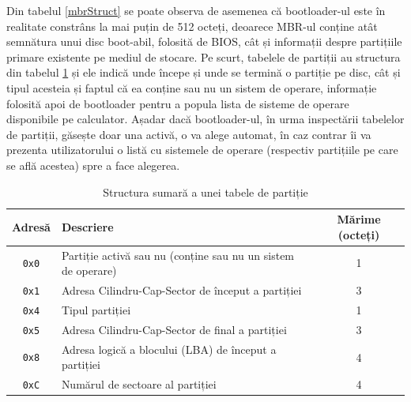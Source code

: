 \documentclass[12pt,a4paper,titlepage]{report}
\begin{document}
Din tabelul \ref{mbrStruct} se poate observa de asemenea că bootloader-ul este în realitate constrâns la mai puțin de 512 octeți, deoarece MBR-ul conține atât semnătura unui disc boot-abil, folosită de BIOS, cât și informații despre partițiile primare existente pe mediul de stocare. Pe scurt, tabelele de partiții au structura din tabelul \ref{partitionTableStruct} \cite{wikiPTE} și ele indică unde începe și unde se termină o partiție pe disc, cât și tipul acesteia și faptul că ea conține sau nu un sistem de operare, informație folosită apoi de bootloader pentru a popula lista de sisteme de operare disponibile pe calculator. Așadar dacă bootloader-ul, în urma inspectării tabelelor de partiții, găsește doar una activă, o va alege automat, în caz contrar îi va prezenta utilizatorului o listă cu sistemele de operare (respectiv partițiile pe care se află acestea) spre a face alegerea.

\begin{table}[h]
    \begin{tabular}{ | c | p{8cm} | c | }
        \hline
        \textbf{Adresă} & \textbf{Descriere} & \textbf{Mărime (octeți)} \\ \hline
        \texttt{0x0} & Partiție activă sau nu (conține sau nu un sistem de operare) & 1 \\ \hline
        \texttt{0x1} & Adresa Cilindru-Cap-Sector de început a partiției & 3 \\ \hline
        \texttt{0x4} & Tipul partiției & 1 \\ \hline
        \texttt{0x5} & Adresa Cilindru-Cap-Sector de final a partiției & 3 \\ \hline
        \texttt{0x8} & Adresa logică a blocului (LBA) de început a partiției & 4 \\ \hline
        \texttt{0xC} & Numărul de sectoare al partiției & 4 \\ \hline
    \end{tabular}
    \centering
    \caption{Structura sumară a unei tabele de partiție}
    \label{partitionTableStruct}
\end{table}
\end{document}
